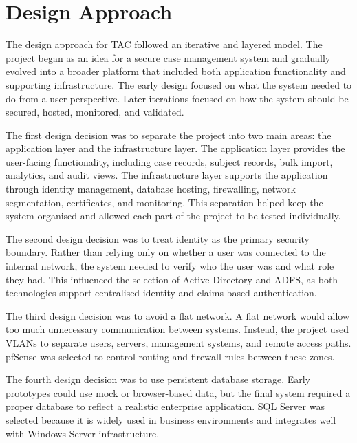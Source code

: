 
\section{Design Approach}

The design approach for TAC followed an iterative and layered model. The project began as an idea for a secure case management system and gradually evolved into a broader platform that included both application functionality and supporting infrastructure. The early design focused on what the system needed to do from a user perspective. Later iterations focused on how the system should be secured, hosted, monitored, and validated.

The first design decision was to separate the project into two main areas: the application layer and the infrastructure layer. The application layer provides the user-facing functionality, including case records, subject records, bulk import, analytics, and audit views. The infrastructure layer supports the application through identity management, database hosting, firewalling, network segmentation, certificates, and monitoring. This separation helped keep the system organised and allowed each part of the project to be tested individually.

The second design decision was to treat identity as the primary security boundary. Rather than relying only on whether a user was connected to the internal network, the system needed to verify who the user was and what role they had. This influenced the selection of Active Directory and ADFS, as both technologies support centralised identity and claims-based authentication.

The third design decision was to avoid a flat network. A flat network would allow too much unnecessary communication between systems. Instead, the project used VLANs to separate users, servers, management systems, and remote access paths. pfSense was selected to control routing and firewall rules between these zones.

The fourth design decision was to use persistent database storage. Early prototypes could use mock or browser-based data, but the final system required a proper database to reflect a realistic enterprise application. SQL Server was selected because it is widely used in business environments and integrates well with Windows Server infrastructure.

